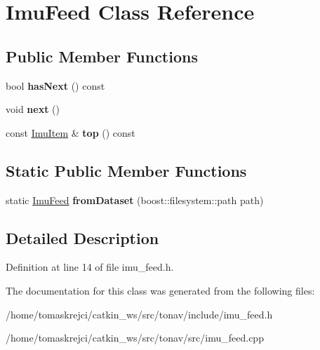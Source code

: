 \hypertarget{class_imu_feed}{\section{Imu\-Feed Class Reference}
\label{class_imu_feed}
}
\subsection*{Public Member Functions}
\begin{DoxyCompactItemize}
\item 
\hypertarget{class_imu_feed_a5ab48b9002ee9eacfe760afc579e1b50}{bool {\bfseries has\-Next} () const }\label{class_imu_feed_a5ab48b9002ee9eacfe760afc579e1b50}

\item 
\hypertarget{class_imu_feed_ab36b0a9833d5687820065483818de270}{void {\bfseries next} ()}\label{class_imu_feed_ab36b0a9833d5687820065483818de270}

\item 
\hypertarget{class_imu_feed_a48e5bf07fb20dc5f55e3078b6c57adc2}{const \hyperlink{class_imu_item}{Imu\-Item} \& {\bfseries top} () const }\label{class_imu_feed_a48e5bf07fb20dc5f55e3078b6c57adc2}

\end{DoxyCompactItemize}
\subsection*{Static Public Member Functions}
\begin{DoxyCompactItemize}
\item 
\hypertarget{class_imu_feed_a65c5b70f27e938f6a13bd55fd0bb5127}{static \hyperlink{class_imu_feed}{Imu\-Feed} {\bfseries from\-Dataset} (boost\-::filesystem\-::path path)}\label{class_imu_feed_a65c5b70f27e938f6a13bd55fd0bb5127}

\end{DoxyCompactItemize}


\subsection{Detailed Description}


Definition at line 14 of file imu\-\_\-feed.\-h.



The documentation for this class was generated from the following files\-:\begin{DoxyCompactItemize}
\item 
/home/tomaskrejci/catkin\-\_\-ws/src/tonav/include/imu\-\_\-feed.\-h\item 
/home/tomaskrejci/catkin\-\_\-ws/src/tonav/src/imu\-\_\-feed.\-cpp\end{DoxyCompactItemize}
